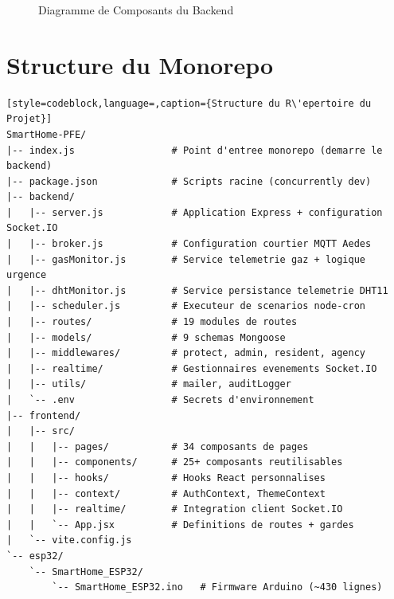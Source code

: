 \begin{figure}[H]
\caption{Diagramme de Composants du Backend}
\label{fig:component}
\end{figure}

\section{Structure du Monorepo}

\begin{lstlisting}[style=codeblock,language=,caption={Structure du R\'epertoire du Projet}]
SmartHome-PFE/
|-- index.js                 # Point d'entree monorepo (demarre le backend)
|-- package.json             # Scripts racine (concurrently dev)
|-- backend/
|   |-- server.js            # Application Express + configuration Socket.IO
|   |-- broker.js            # Configuration courtier MQTT Aedes
|   |-- gasMonitor.js        # Service telemetrie gaz + logique urgence
|   |-- dhtMonitor.js        # Service persistance telemetrie DHT11
|   |-- scheduler.js         # Executeur de scenarios node-cron
|   |-- routes/              # 19 modules de routes
|   |-- models/              # 9 schemas Mongoose
|   |-- middlewares/         # protect, admin, resident, agency
|   |-- realtime/            # Gestionnaires evenements Socket.IO
|   |-- utils/               # mailer, auditLogger
|   `-- .env                 # Secrets d'environnement
|-- frontend/
|   |-- src/
|   |   |-- pages/           # 34 composants de pages
|   |   |-- components/      # 25+ composants reutilisables
|   |   |-- hooks/           # Hooks React personnalises
|   |   |-- context/         # AuthContext, ThemeContext
|   |   |-- realtime/        # Integration client Socket.IO
|   |   `-- App.jsx          # Definitions de routes + gardes
|   `-- vite.config.js
`-- esp32/
    `-- SmartHome_ESP32/
        `-- SmartHome_ESP32.ino   # Firmware Arduino (~430 lignes)
\end{lstlisting}

